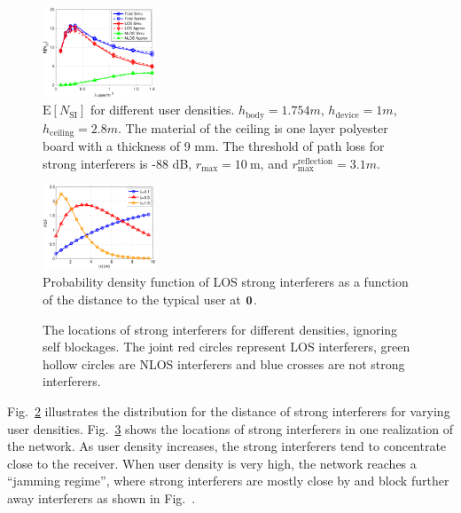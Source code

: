 \documentclass[10pt, conference, letterpaper]{IEEEtran}
\begin{document}
\begin{figure}
	\centering
	\includegraphics[width = 0.3\textwidth]{Channel_en_si.pdf}
	\caption{$\mathrm{E}[N_{\mathrm{SI}}]$ for different user densities. $h_{\mathrm{body}} = 1.754m$,  $h_{\mathrm{device}}= 1m$, $h_{\mathrm{ceiling}}=2.8m$. 
		The material of the ceiling is one layer polyester board with a thickness of 9 mm. 
		The threshold of path loss for strong interferers is -88 dB, $r_{\max} = 10\mathrm{~m}$, and $r_{\max}^{\mathrm{reflection}} = 3.1m$.}
	\label{fig:channel:en_si}
\end{figure}


\begin{figure}
	\centering
	\includegraphics[width = 0.3\textwidth]{Channel_si_pdf.pdf}
	\caption{Probability density function of LOS strong interferers as a function of the distance to the typical user at $\bf{0}$.}
	\label{fig:Channel_si_pdf}
\end{figure}

\begin{figure}[htp]	
	\centering
	 \hfill
	 \hfill
	\caption{The locations of strong interferers for different densities, ignoring self blockages. The joint red circles represent LOS interferers, green hollow circles are NLOS interferers and blue crosses are not strong interferers.}
	\label{fig:channel:jamming}
\end{figure}

Fig.~\ref{fig:Channel_si_pdf} illustrates the distribution for the distance of strong interferers for varying user densities. 
Fig.~\ref{fig:channel:jamming} shows the locations of strong interferers in one realization of the network.
As user density increases, the strong interferers tend to concentrate close to the receiver. When user density is very high, the network reaches a ``jamming regime'', where strong interferers are mostly close by and block further away interferers as shown in Fig.~.
\end{document}
